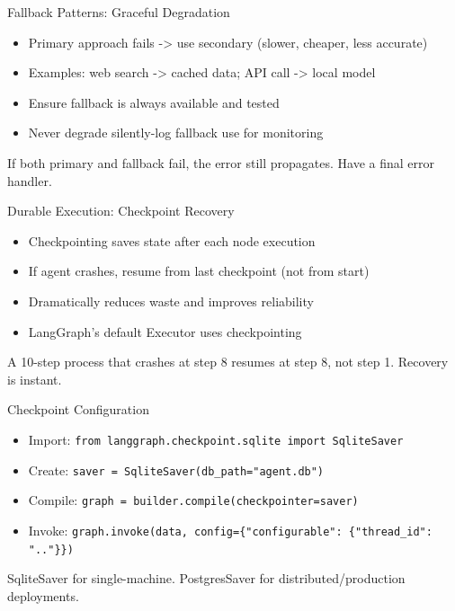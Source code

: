 \documentclass[aspectratio=169,11pt]{beamer}
\begin{document}
\begin{frame}{Fallback Patterns: Graceful Degradation}
\setlength{\itemsep}{1pt}
\begin{itemize}
\item Primary approach fails -> use secondary (slower, cheaper, less accurate)
\item Examples: web search -> cached data; API call -> local model
\item Ensure fallback is always available and tested
\item Never degrade silently-log fallback use for monitoring
\end{itemize}
\vspace{0.15cm}
\begin{warningbox}
If both primary and fallback fail, the error still propagates. Have a final error handler.
\end{warningbox}
\end{frame}

\begin{frame}{Durable Execution: Checkpoint Recovery}
\setlength{\itemsep}{1pt}
\begin{itemize}
\item Checkpointing saves state after each node execution
\item If agent crashes, resume from last checkpoint (not from start)
\item Dramatically reduces waste and improves reliability
\item LangGraph's default Executor uses checkpointing
\end{itemize}
\vspace{0.15cm}
\begin{conceptbox}
A 10-step process that crashes at step 8 resumes at step 8, not step 1. Recovery is instant.
\end{conceptbox}
\end{frame}

\begin{frame}{Checkpoint Configuration}
\setlength{\itemsep}{1pt}
\begin{itemize}
\item Import: \texttt{from langgraph.checkpoint.sqlite import SqliteSaver}
\item Create: \texttt{saver = SqliteSaver(db\_path="agent.db")}
\item Compile: \texttt{graph = builder.compile(checkpointer=saver)}
\item Invoke: \texttt{graph.invoke(data, config=\{"configurable": \{"thread\_id": ".."\}\})}
\end{itemize}
\vspace{0.1cm}
\begin{tipbox}
SqliteSaver for single-machine. PostgresSaver for distributed/production deployments.
\end{tipbox}
\end{frame}
\end{document}
